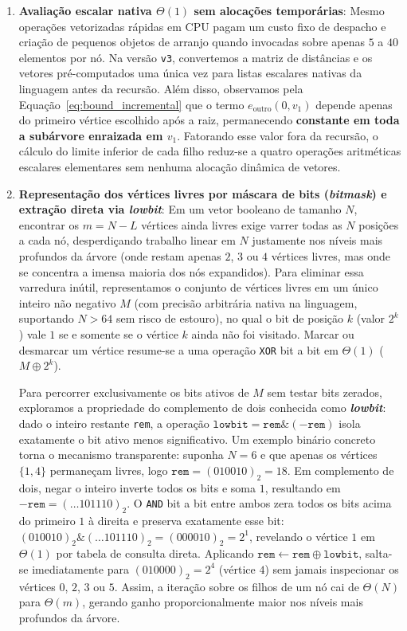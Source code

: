 \begin{enumerate}
  \item \textbf{Avaliação escalar nativa $\Theta(1)$ sem alocações temporárias}:
  Mesmo operações vetorizadas rápidas em CPU pagam um custo fixo de despacho e criação de
  pequenos objetos de arranjo quando invocadas sobre apenas $5$ a $40$ elementos por nó. Na
  versão \texttt{v3}, convertemos a matriz de distâncias e os vetores pré-computados uma única
  vez para listas escalares nativas da linguagem antes da recursão. Além disso, observamos pela
  Equação~\eqref{eq:bound_incremental} que o termo $e_{\text{outro}}(0, v_1)$ depende apenas do
  primeiro vértice escolhido após a raiz, permanecendo \textbf{constante em toda a subárvore
  enraizada em $v_1$}. Fatorando esse valor fora da recursão, o cálculo do limite inferior de
  cada filho reduz-se a quatro operações aritméticas escalares elementares sem nenhuma alocação
  dinâmica de vetores.

  \item \textbf{Representação dos vértices livres por máscara de bits (\textit{bitmask}) e
  extração direta via \textit{lowbit}}:
  Em um vetor booleano de tamanho $N$, encontrar os $m = N - L$ vértices ainda livres exige
  varrer todas as $N$ posições a cada nó, desperdiçando trabalho linear em $N$ justamente nos
  níveis mais profundos da árvore (onde restam apenas $2$, $3$ ou $4$ vértices livres, mas onde
  se concentra a imensa maioria dos nós expandidos). Para eliminar essa varredura inútil,
  representamos o conjunto de vértices livres em um único inteiro não negativo $M$ (com precisão
  arbitrária nativa na linguagem, suportando $N > 64$ sem risco de estouro), no qual o bit de
  posição $k$ (valor $2^k$) vale $1$ se e somente se o vértice $k$ ainda não foi visitado.
  Marcar ou desmarcar um vértice resume-se a uma operação \texttt{XOR} bit a bit em $\Theta(1)$
  ($M \oplus 2^k$).

  Para percorrer exclusivamente os bits ativos de $M$ sem testar bits zerados, exploramos a
  propriedade do complemento de dois conhecida como \textbf{\textit{lowbit}}: dado o inteiro
  restante \texttt{rem}, a operação $\texttt{lowbit} = \texttt{rem} \mathbin{\&} (-\texttt{rem})$
  isola exatamente o bit ativo menos significativo. Um exemplo binário concreto torna o
  mecanismo transparente: suponha $N = 6$ e que apenas os vértices $\{1, 4\}$ permaneçam livres,
  logo $\texttt{rem} = (010010)_2 = 18$. Em complemento de dois, negar o inteiro inverte todos os
  bits e soma $1$, resultando em $-\texttt{rem} = (\dots 101110)_2$. O \texttt{AND} bit a bit
  entre ambos zera todos os bits acima do primeiro $1$ à direita e preserva exatamente esse bit:
  $(010010)_2 \mathbin{\&} (\dots 101110)_2 = (000010)_2 = 2^1$, revelando o vértice $1$ em
  $\Theta(1)$ por tabela de consulta direta. Aplicando $\texttt{rem} \leftarrow \texttt{rem}
  \oplus \texttt{lowbit}$, salta-se imediatamente para $(010000)_2 = 2^4$ (vértice $4$) sem
  jamais inspecionar os vértices $0$, $2$, $3$ ou $5$. Assim, a iteração sobre os filhos de um
  nó cai de $\Theta(N)$ para $\Theta(m)$, gerando ganho proporcionalmente maior nos níveis mais
  profundos da árvore.


\end{enumerate}
